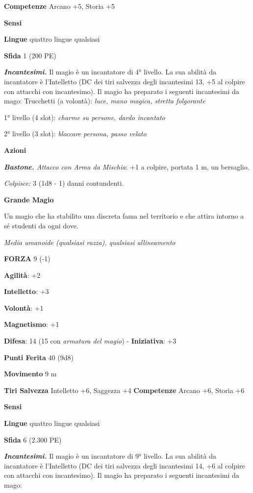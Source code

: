 \begin{multicols}{2}
\textbf{Competenze} Arcano +5, Storia +5

\textbf{Sensi} 

\textbf{Lingue} quattro lingue qualsiasi

\textbf{Sfida} 1 (200 PE)\smallskip

\emph{\textbf{Incantesimi.}} Il magio è un incantatore di 4° livello. La
sua abilità da incantatore è l'Intelletto (DC dei tiri salvezza degli
incantesimi 13, +5 al colpire con attacchi con incantesimo). Il magio ha
preparato i seguenti incantesimi da mago: Trucchetti (a volontà):
\emph{luce, mano magica, stretta folgorante}

1° livello (4 slot): \emph{charme su persone, dardo incantato}

2° livello (3 slot): \emph{bloccare persona, passo velato}

\smallskip\textbf{Azioni}

\emph{\textbf{Bastone.} Attacco con Arma da Mischia}: +1 a colpire,
portata 1 m, un bersaglio.

\emph{Colpisce:} 3 (1d8 - 1) danni contundenti.

\textbf{Grande Magio}

Un magio che ha stabilito una discreta fama nel territorio e che attira
intorno a sé studenti da ogni dove.

\emph{Media umanoide (qualsiasi razza), qualsiasi allineamento}

\textbf{FORZA} 9 (-1)

\textbf{Agilità}: +2

\textbf{Intelletto}: +3

\textbf{Volontà}: +1

\textbf{Magnetismo}: +1

\textbf{Difesa}: 14 (15 con \emph{armatura del magio}) - \textbf{Iniziativa}: +3

\textbf{Punti Ferita} 40 (9d8)

\textbf{Movimento} 9 m

\textbf{Tiri Salvezza} Intelletto +6, Saggezza +4 \textbf{Competenze}
Arcano +6, Storia +6

\textbf{Sensi} 

\textbf{Lingue} quattro lingue qualsiasi

\textbf{Sfida} 6 (2.300 PE)\smallskip

\emph{\textbf{Incantesimi.}} Il magio è un incantatore di 9° livello. La
sua abilità da incantatore è l'Intelletto (DC dei tiri salvezza degli
incantesimi 14, +6 al colpire con attacchi con incantesimo). Il magio ha
preparato i seguenti incantesimi da mago:


\end{multicols}
